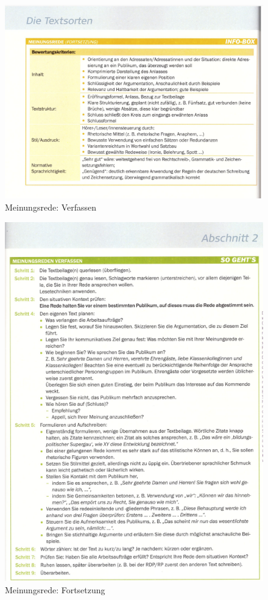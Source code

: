 \begin{figure}[h][p]
    \centering
    \includegraphics[scale=0.8]{pics/Screenshot from 2023-02-06 12-30-22.png}
    \caption{Meinungsrede: Verfassen}
    \label{fig:impl:Meinungsrede2}
\end{figure}
\begin{figure}[h][p]
    \centering
    \includegraphics[scale=0.8]{pics/Screenshot from 2023-02-06 12-30-34.png}
    \caption{Meinungsrede: Fortsetzung}
    \label{fig:impl:Meinungsrede3}
\end{figure}
